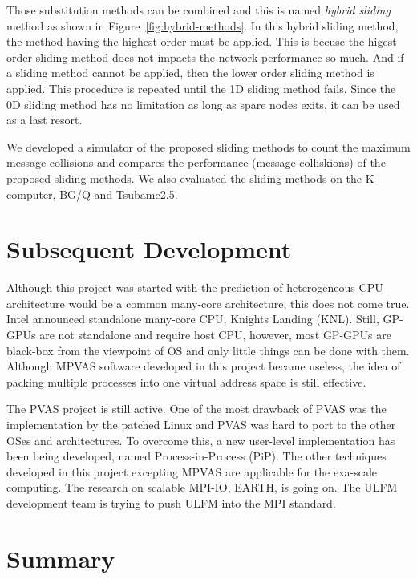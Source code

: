 Those substitution methods can be combined and this is named {\em
hybrid sliding} method as shown in Figure~\ref{fig:hybrid-methods}. In
this hybrid sliding method, the method having the highest order must
be applied. This is becuse the higest order sliding method does not
impacts the network performance so much. 
And if a sliding method cannot be applied, then the
lower order sliding method is applied. This procedure is repeated
until the 1D sliding method fails.
Since the 0D sliding method has no
limitation as long as spare nodes exits, it can be used as a last resort.

We developed a simulator of the proposed sliding methods to count the 
maximum message collisions and compares the performance (message
colliskions) of the proposed sliding methods. We also evaluated the
sliding methods on the K computer, BG/Q and
Tsubame2.5\cite{Hori:2015:SSF:2802658.2802670}.  

\section{Subsequent Development}

Although this project was started with the prediction of
heterogeneous CPU architecture would be a common many-core
architecture, this does not come true. Intel announced standalone
many-core CPU, Knights Landing (KNL). Still, GP-GPUs are not
standalone and require host CPU, however, most GP-GPUs are black-box
from the viewpoint of OS and only little things can be done with
them. Although MPVAS software developed in this project became
useless, the idea of packing multiple processes into one virtual
address space is still effective.

The PVAS project is still active. One of the most drawback of PVAS was
the implementation by the patched Linux and PVAS was hard to port to the
other OSes and architectures. To overcome this, a new
user-level implementation has been being developed, named
Process-in-Process (PiP). 
The other techniques developed in this project excepting MPVAS are
applicable for the exa-scale computing. The research on scalable
MPI-IO, EARTH, is going on. The ULFM development team is
trying to push ULFM into the MPI standard.

\section{Summary}

